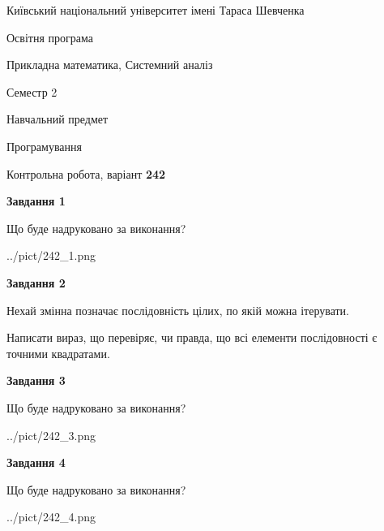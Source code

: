 \documentclass[12pt, ukrainian]{article}
\begin{document}
{{\begin {small}\par
{ \center  Київський національний університет імені Тараса Шевченка \par}
{\parbox {5 cm}{Освітня програма \hfill}{\parbox {8 cm}{Прикладна математика, Системний аналіз \hfill}}\parbox {5 cm}{\hfill Семестр 2}}\par
{\parbox {5 cm} {Навчальний предмет \hfill}\parbox {7 cm}{Програмування \hfill}\parbox {6cm}{\hfill}\par}\vspace{-7pt} \end{small}}{\center Контрольна робота, варіант  \No \textbf
{ 242 }\par}}
{
\begin {large}
{\begin {center}\textbf{Завдання 1}\end {center}}\par
Що буде надруковано за виконання?\par\par
\begin{center}
	{../pict/242_1.png}
\end{center}
\newpage

{\begin {center}\textbf{Завдання 2}\end {center}}\par
Нехай змінна  позначає послідовність цілих, по якій можна ітерувати.

Написати вираз, що перевіряє, чи правда, що всі елементи послідовності є точними квадратами.\par
\newpage

{\begin {center}\textbf{Завдання 3}\end {center}}\par
Що буде надруковано за виконання?
\begin{center}
	{../pict/242_3.png}
\end{center}
\newpage

{\begin {center}\textbf{Завдання 4}\end {center}}\par
Що буде надруковано за виконання?\par
\begin{center}
	{../pict/242_4.png}
\end{center}
\newpage


\end{large}}
\end{document}
